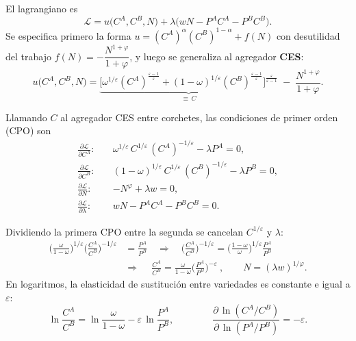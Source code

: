 \documentclass[11pt]{article}
\renewcommand{\boxed}[1]{#1}     %
\theoremstyle{definition}
\begin{document}
El lagrangiano es
\begin{equation}
\mathcal{L}=u\big(C^{A},C^{B},N\big)+\lambda\big(wN-P^{A}C^{A}-P^{B}C^{B}\big).
\end{equation}
Se especifica primero la forma $u=(C^{A})^{\alpha}(C^{B})^{1-\alpha}+f(N)$ con desutilidad del
trabajo $f(N)=-\dfrac{N^{1+\varphi}}{1+\varphi}$, y luego se generaliza al agregador \textbf{CES}:
\begin{equation}
u\big(C^{A},C^{B},N\big)=
\underbrace{\Big[\omega^{1/\varepsilon}(C^{A})^{\frac{\varepsilon-1}{\varepsilon}}
+(1-\omega)^{1/\varepsilon}(C^{B})^{\frac{\varepsilon-1}{\varepsilon}}\Big]^{\frac{\varepsilon}{\varepsilon-1}}}_{\;\equiv\,C\;}
\;-\;\frac{N^{1+\varphi}}{1+\varphi}.
\end{equation}

Llamando $C$ al agregador CES entre corchetes, las condiciones de primer orden (CPO) son
\begin{align}
\frac{\partial\mathcal{L}}{\partial C^{A}}:\quad
& \omega^{1/\varepsilon}\,C^{1/\varepsilon}\,(C^{A})^{-1/\varepsilon}-\lambda P^{A}=0, \\
\frac{\partial\mathcal{L}}{\partial C^{B}}:\quad
& (1-\omega)^{1/\varepsilon}\,C^{1/\varepsilon}\,(C^{B})^{-1/\varepsilon}-\lambda P^{B}=0, \\
\frac{\partial\mathcal{L}}{\partial N}:\quad
& -N^{\varphi}+\lambda w=0, \\
\frac{\partial\mathcal{L}}{\partial \lambda}:\quad
& wN-P^{A}C^{A}-P^{B}C^{B}=0 .
\end{align}

Dividiendo la primera CPO entre la segunda se cancelan $C^{1/\varepsilon}$ y $\lambda$:
\begin{align}
\Big(\frac{\omega}{1-\omega}\Big)^{1/\varepsilon}\Big(\frac{C^{A}}{C^{B}}\Big)^{-1/\varepsilon}
&=\frac{P^{A}}{P^{B}}
\quad\Longrightarrow\quad
\Big(\frac{C^{A}}{C^{B}}\Big)^{-1/\varepsilon}
=\Big(\frac{1-\omega}{\omega}\Big)^{1/\varepsilon}\frac{P^{A}}{P^{B}} \\[2pt]
&\Longrightarrow\quad
\boxed{\ \frac{C^{A}}{C^{B}}=\frac{\omega}{1-\omega}\Big(\frac{P^{A}}{P^{B}}\Big)^{-\varepsilon}\ },
\qquad
N=(\lambda w)^{1/\varphi}.
\end{align}
En logaritmos, la elasticidad de sustitución entre variedades es constante e igual a $\varepsilon$:
\begin{equation}
\ln\!\frac{C^{A}}{C^{B}}=\ln\frac{\omega}{1-\omega}-\varepsilon\,\ln\frac{P^{A}}{P^{B}},
\qquad\qquad
\frac{\partial\,\ln(C^{A}/C^{B})}{\partial\,\ln(P^{A}/P^{B})}=-\varepsilon .
\end{equation}
\end{document}
